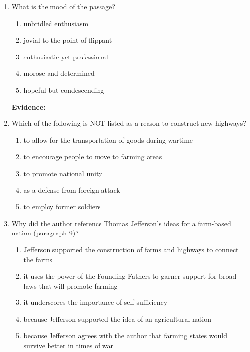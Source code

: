 \bigskip
\begin{enumerate}

\item What is the mood of the passage?

\bigskip
\begin{enumerate}[label=(\Alph*)]
\item unbridled enthusiasm
\item jovial to the point of flippant
\item enthusiastic yet professional
\item morose and determined
\item hopeful but condescending
\end{enumerate}

\bigskip
\textbf{Evidence:} \hrulefill

\bigskip
\item Which of the following is NOT listed as a reason to construct new highways?

\bigskip
\begin{enumerate}[label=(\Alph*)]
\item to allow for the transportation of goods during wartime
\item to encourage people to move to farming areas
\item to promote national unity
\item as a defense from foreign attack
\item to employ former soldiers
\end{enumerate}

\bigskip
\item Why did the author reference Thomas Jefferson's ideas for a farm-based nation (paragraph 9)?

\bigskip
\begin{enumerate}[label=(\Alph*)]
\item Jefferson supported the construction of farms and highways to connect the farms
\item it uses the power of the Founding Fathers to garner support for broad laws that will promote farming
\item it underscores the importance of self-sufficiency
\item because Jefferson supported the idea of an agricultural nation
\item because Jefferson agrees with the author that  farming states would survive better in times of war
\end{enumerate}


\end{enumerate}
